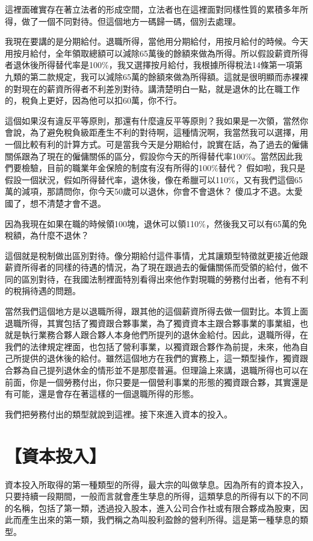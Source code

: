 \documentclass[]{ctexbook}
\begin{document}
這裡面確實存在著立法者的形成空間，立法者也在這裡面對同樣性質的累積多年所得，做了一個不同對待。但這個地方一碼歸一碼，個別去處理。

我現在要講的是分期給付。退職所得，當他用分期給付，用按月給付的時候。今天用按月給付，全年領取總額可以減除65萬後的餘額來做為所得。所以假設薪資所得者退休後所得替代率是100\%，我又選擇按月給付，我根據所得稅法14條第一項第九類的第二款規定，我可以減除65萬的餘額來做為所得額。這就是很明顯而赤裸裸的對現在的薪資所得者不利差別對待。講清楚明白一點，就是退休的比在職工作的，稅負上更好，因為他可以扣60萬，你不行。

這個如果沒有違反平等原則，那還有什麼違反平等原則？我如果是一次領，當然你會說，為了避免稅負級距產生不利的對待啊，這種情況啊，我當然我可以選擇，用一個比較有利的計算方式。可是當我今天是分期給付，說實在話，為了過去的僱傭關係跟為了現在的僱傭關係的區分，假設你今天的所得替代率100\%。當然因此我們要檢驗，目前的職業年金保險的制度有沒有所得的100\%替代？ 假如啦，我只是假設一個狀況，假如所得替代率，退休後，像在希臘可以110\%，又有我們這個65萬的減項，那請問你，你今天50歲可以退休，你會不會退休？ 傻瓜才不退。太愛國了，想不清楚才會不退。

因為我現在如果在職的時候領100塊，退休可以領110\%，然後我又可以有65萬的免稅額，為什麼不退休？

這個就是稅制做出區別對待。像分期給付這件事情，尤其讓類型特徵就更接近他跟薪資所得者的同樣的待遇的情況，為了現在跟過去的僱傭關係而受領的給付，做不同的區別對待，在我國法制裡面特別看得出來他作對現職的勞務付出者，他有不利的稅捐待遇的問題。

當然我們這個地方是以退職所得，跟其他的這個薪資所得去做一個對比。本質上面退職所得，其實包括了獨資跟合夥事業，為了獨資資本主跟合夥事業的事業組，也就是執行業務合夥人跟合夥人本身他們所提列的退休金給付。因此，退職所得，在我們的法律規定裡面，也包括了營利事業，以獨資跟合夥作為前提，未來，他為自己所提供的退休後的給付。雖然這個地方在我們的實務上，這一類型操作，獨資跟合夥為自己提列退休金的情形並不是那麼普遍。但理論上來講，退職所得也可以在前面，你是一個勞務付出，你只要是一個營利事業的形態的獨資跟合夥，其實還是有可能，還是會存在著這樣的一個退職所得的形態。

我們把勞務付出的類型就說到這裡。接下來進入資本的投入。

\hypertarget{ux8cc7ux672cux6295ux5165}{%
\section{【資本投入】}\label{ux8cc7ux672cux6295ux5165}}

資本投入所取得的第一種類型的所得，最大宗的叫做孳息。因為所有的資本投入，只要持續一段期間，一般而言就會產生孳息的所得，這類孳息的所得有以下的不同的名稱，包括了第一類，透過投入股本，進入公司合作社或有限合夥成為股東，因此而產生出來的第一類，我們稱之為叫股利盈餘的營利所得。這是第一種孳息的類型。
\end{document}
